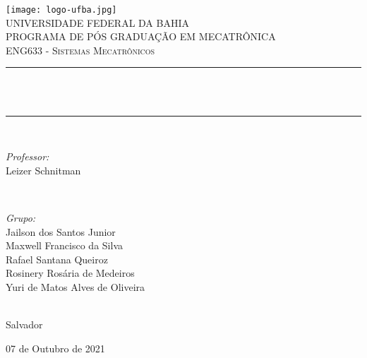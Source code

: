 \begin{titlepage}
	\centering
	\texttt{[image: logo-ufba.jpg]}\\[0.5 cm]	%
	\textsc{\LARGE UNIVERSIDADE FEDERAL DA BAHIA}\\[0.5 cm]	%
	\textsc{\large PROGRAMA DE PÓS GRADUAÇÃO EM MECATRÔNICA}\\[1 cm]
	\textsc{\Large ENG633 - Sistemas Mecatrônicos}\\[0.5 cm]				%
	\rule{\linewidth}{0.2 mm} \\
	{ \huge \bfseries \thetitle}\\
	\rule{\linewidth}{0.2 mm} \\[1 cm]
	
	\begin{minipage}{0.5\textwidth}
		\begin{flushleft} \large
			\emph{Professor:}\\
			Leizer Schnitman\\
		\end{flushleft}
	\end{minipage}~
	\begin{minipage}{0.5\textwidth}
		
		\begin{flushright} \large
			\emph{Grupo:} \\
			Jailson dos Santos Junior\\
			Maxwell Francisco da Silva\\
			Rafael Santana Queiroz\\
			Rosinery Rosária de Medeiros\\
			Yuri de Matos Alves de Oliveira
		\end{flushright}
		
	\end{minipage}\\[1.0 cm]
	
	
	Salvador
	
	07 de Outubro de 2021
	
	
	
	
\end{titlepage}